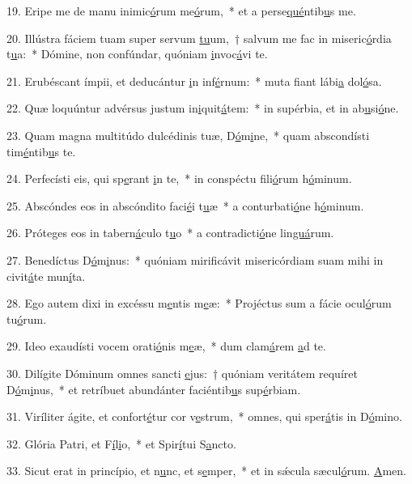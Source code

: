 19. Eripe me de manu inimic\uline{ó}rum me\uline{ó}rum,~* et a perse\uline{qué}ntib\uline{u}s me.\par 
20. Illústra fáciem tuam super servum \uline{tu}um,~† salvum me fac in miseric\uline{ó}rdia t\uline{u}a:~* Dómine, non confúndar, quóniam \uline{i}nvoc\uline{á}vi te.\par 
21. Erubéscant ímpii, et deducántur \uline{i}n inf\uline{é}rnum:~* muta fiant lábi\uline{a} dol\uline{ó}sa.\par 
22. Quæ loquúntur advérsus justum in\uline{i}quit\uline{á}tem:~* in supérbia, et in ab\uline{u}si\uline{ó}ne.\par 
23. Quam magna multitúdo dulcédinis tuæ, D\uline{ó}m\uline{i}ne,~* quam abscondísti tim\uline{é}ntib\uline{u}s te.\par 
24. Perfecísti eis, qui sp\uline{e}rant \uline{i}n te,~* in conspéctu fili\uline{ó}rum h\uline{ó}minum.\par 
25. Abscóndes eos in abscóndito faci\uline{é}i t\uline{u}æ~* a conturbati\uline{ó}ne h\uline{ó}minum.\par 
26. Próteges eos in tabern\uline{á}culo t\uline{u}o~* a contradicti\uline{ó}ne lin\uline{guá}rum.\par 
27. Benedíctus D\uline{ó}m\uline{i}nus:~* quóniam mirificávit misericórdiam suam mihi in civit\uline{á}te mun\uline{í}ta.\par 
28. Ego autem dixi in excéssu m\uline{e}ntis m\uline{e}æ:~* Projéctus sum a fácie ocul\uline{ó}rum tu\uline{ó}rum.\par 
29. Ideo exaudísti vocem orati\uline{ó}nis m\uline{e}æ,~* dum clam\uline{á}rem \uline{a}d te.\par 
30. Dilígite Dóminum omnes sancti \uline{e}jus:~† quóniam veritátem requíret D\uline{ó}m\uline{i}nus,~* et retríbuet abundánter faciéntib\uline{u}s sup\uline{é}rbiam.\par 
31. Viríliter ágite, et confort\uline{é}tur cor v\uline{e}strum,~* omnes, qui sper\uline{á}tis in D\uline{ó}mino.\par 
32. Glória Patri, et F\uline{í}l\uline{i}o,~* et Spir\uline{í}tui S\uline{a}ncto.\par 
33. Sicut erat in princípio, et n\uline{u}nc, et s\uline{e}mper,~* et in sǽcula sæcul\uline{ó}rum. \uline{A}men.\par 
